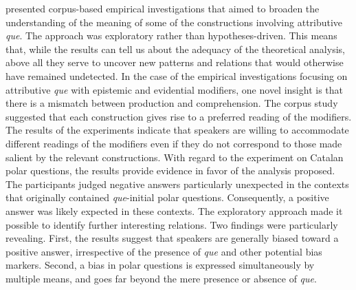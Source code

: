 \begin{sloppypar}
 presented  corpus-based empirical investigations that aimed to broaden the understanding of the meaning of some of the constructions involving attributive \emph{que}. The approach  was  exploratory rather than  hypotheses-driven. This  means that, while the results can tell us about the adequacy of the theoretical analysis, above all they serve to uncover new patterns and relations that would otherwise have remained undetected. In the case of the empirical investigations focusing on attributive \emph{que} with epistemic and evidential  modifiers, one novel insight is that there is a mismatch between production and  comprehension. The corpus study suggested that each construction gives rise to a preferred reading of the modifiers. The results of the experiments indicate that speakers are willing to accommodate different readings of the modifiers even if  they do not correspond to those made salient by the relevant constructions. With regard to the experiment on Catalan polar questions, the results  provide  evidence in favor of the analysis proposed. The participants judged negative answers particularly unexpected in the contexts that originally contained \emph{que}-initial polar questions. Consequently,  a positive answer was likely expected in these contexts. The exploratory approach made it possible to identify further interesting relations. Two findings were particularly  revealing.  First, the results suggest that speakers are generally biased toward a positive answer,  irrespective of the presence of  \emph{que} and other potential bias markers. Second,  a bias in polar questions is expressed simultaneously by multiple means, and  goes far beyond the mere presence or absence of \emph{que}.
\end{sloppypar}
